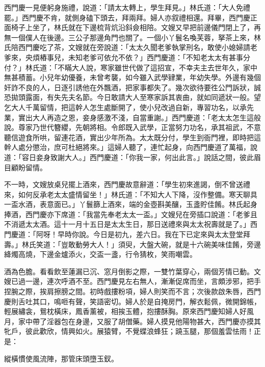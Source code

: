 西門慶一見便躬身施禮，說道：「請太太轉上，學生拜見。」林氏道：「大人免禮罷。」西門慶不肯，就側身磕下頭去，拜兩拜。婦人亦叙禮相還。拜畢，西門慶正面椅子上坐了，林氏就在下邊梳背炕沿斜僉相陪。文嫂又早把前邊儀門閉上了，再無一個僕人在後邊。三公子那邊角門也關了。一個小丫鬟名喚芙蓉，拏茶上來，林氏陪西門慶吃了茶，文嫂就在旁說道：「太太久聞老爹執掌刑名，敢使小媳婦請老爹來，央煩樁事兒，未知老爹可依允不依？」{}西門慶道：「不知老太太有甚事分付？」林氏道：「不瞞大人說，寒家雖世代做了這招宣，不幸夫主去世年久，家中無甚積蓄。小兒年幼優養，未曾考襲，如今雖入武學肄業，年幼失學。外邊有幾個奸詐不良的人，日逐引誘他在外飄酒，把家事都失了。幾次欲待要徃公門訴狀，誠恐拋頭露面，有失先夫名節。{}今日敢請大人至寒家訴其衷曲，就如同遞狀一般。望乞大人千萬留情，把這幹人怎生處斷開了，使小兒改過自新，專習功名，以承先業，實出大人再造之恩，妾身感激不淺，自當重謝。」西門慶道：「老太太怎生這般說。尊家乃世代簪纓，先朝將相。令郎既入武學，正當努力功名，承其祖武，不意聽信遊食所哄，留連花酒，實出少年所為。太太既分付，學生到衙門裡，即時把這幹人處分懲治，庶可杜絕將來。」這婦人聽了，連忙起身，向西門慶道了萬福，說道：「容日妾身致謝大人。」西門慶道：「你我一家，何出此言。」說話之間，彼此眉目顧盼留情。

不一時，文嫂放桌兒擺上酒來，西門慶故意辭道：{}「學生初來進謁，倒不曾送禮來，如何反承老太太盛情留坐！」林氏道：「不知大人下降，沒作整備。寒天聊具一盃水酒，表意面已。」丫鬟篩上酒來，端的金壺斟美釀，玉盞貯佳餚。林氏起身捧酒，西門慶亦下席道：「我當先奉老太太一盃。」文嫂兒在旁插口說道：「老爹且不消遞太太酒。這十一月十五日是太太生日，那日送禮來與太太祝壽就是了。」西門慶道：「阿呀！早時你說。今日是初九，差六日。我在下已定來與太太登堂拜壽。」林氏笑道：「豈敢動勞大人！」須臾，大盤大碗，就是十六碗美味佳餚，旁邊絳燭高燒，下邊金爐添火，交盃一盞，行令猜枚，笑雨嘲雲。

酒為色膽。看看飲至蓮漏已沉、窓月倒影之際，一雙竹葉穿心，兩個芳情已動。文嫂已過一邊，連次呼酒不至。西門慶見左右無人，漸漸促席而坐，言頗涉邪，把手捏腕之際，挨肩擦膀之間。初時戲摟粉項，婦人則笑而不言；次後款啟朱唇，西門慶則舌吐其口，鳴咂有聲，笑語密切。{}婦人於是自掩房門，解衣鬆佩，微開錦帳，輕展繡衾，鴛枕橫床，鳳香薰被，相挨玉體，抱摟酥胸。原來西門慶知婦人好風月，家中帶了淫器包在身邊，又服了胡僧藥。婦人摸見他陽物甚大，西門慶亦摸其牝戶，彼此歡欣，情興如火。展猿臂，不覺蝶浪蜂狂；蹺玉腿，那個羞雲怯雨！正是：

\begin{myquote} 
縱橫慣使風流陣，那管床頭墮玉釵。
\end{myquote} 

